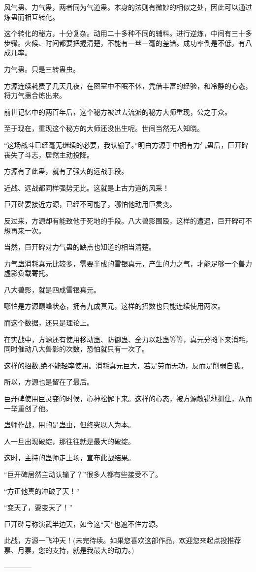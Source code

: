 \begin{this_body}
风气蛊、力气蛊，两者同为气道蛊。本身的法则有微妙的相似之处，因此可以通过炼蛊而相互转化。

这个转化的秘方，十分复杂。动用二十多种不同的辅料。进行逆炼，中间有三十多步骤。火候、时间都要把握清楚，不能有一丝一毫的差错。成功率倒是不低，有八成几率。

力气蛊。只是三转蛊虫。

方源连续耗费了几天几夜，在密室中不眠不休，凭借丰富的经验，和冷静的心态，将力气蛊合炼出来。

前世记忆中的两百年后，这个秘方被过去流派的秘方大师重现，公之于众。

至于现在，重现这个秘方的大师还没出生呢。世间当然无人知晓。

“这场战斗已经毫无继续的必要，我认输了。”明白方源手中拥有力气蛊后，巨开碑丧失了斗志，居然主动投降。

方源有了此蛊，就有了强大的远战手段。

近战、远战都同样强势无比。这就是上古力道的风采！

巨开碑要接近方源，已经不可能了，哪怕他动用巨灵变。

反过来，方源却有能致他于死地的手段。八大兽影围殴，这样的遭遇，巨开碑可不想再来一次。

当然，巨开碑对力气蛊的缺点也知道的相当清楚。

力气蛊消耗真元比较多，需要半成的雪银真元，产生的力之气，才能足够一个兽力虚影负载寄托。

八大兽影，就是四成雪银真元。

哪怕是方源巅峰状态，拥有九成真元，这样的招数也只能连续使用两次。

而这个数据，还只是理论上。

在实战中，方源还有使用移动蛊、防御蛊、全力以赴蛊等等，真元分摊下来消耗，同时催动八大兽影的次数，恐怕就只有一次了。

这样的招数,绝不能轻率使用。消耗真元巨大，若是劳而无功，反而是削弱自我。

所以，方源也是留在了最后。

巨开碑使用巨灵变的时候，心神松懈下来。这样的心态，被方源敏锐地抓住，从而一举重创了他。

蛊师作战，用的是蛊虫，但终究以人为本。

人一旦出现破绽，那往往就是最大的破绽。

这时，主持的蛊师走上场，宣布此战结果。

“巨开碑居然主动认输了？”很多人都有些接受不了。

“方正他真的冲破了天！”

“变天了，要变天了！”

巨开碑号称演武半边天，如今这“天”也遮不住方源。

此战，方源一飞冲天！(未完待续。如果您喜欢这部作品，欢迎您来起点投推荐票、月票，您的支持，就是我最大的动力。)

------------

\end{this_body}

